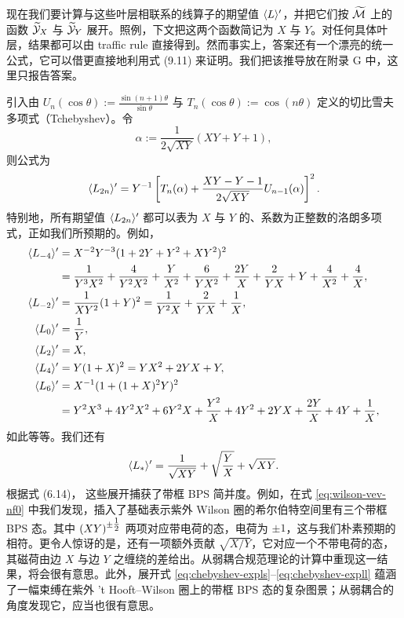现在我们要计算与这些叶层相联系的线算子的期望值 $\langle L \rangle'$，并把它们按 $\widetilde{\cal M}$ 上的函数 $\widetilde{\cal Y}_X$ 与 $\widetilde{\cal Y}_Y$ 展开。照例，下文把这两个函数简记为 $X$ 与 $Y$。对任何具体叶层，结果都可以由 traffic rule 直接得到。然而事实上，答案还有一个漂亮的统一公式，它可以借更直接地利用式 (9.11)%
来证明。我们把该推导放在附录 G%
中，这里只报告答案。

引入由 $U_n(\cos\theta) := \frac{\sin(n+1)\theta}{\sin\theta}$ 与 $T_n(\cos\theta) := \cos(n\theta)$ 定义的切比雪夫多项式（Tchebyshev）。令
\begin{equation}
 \alpha := \frac{1}{2 \sqrt{XY}} \left( XY + Y + 1 \right),
\end{equation}
则公式为
\begin{equation}\label{eq:chebyshev-form}
\langle L_{2n} \rangle' = Y^{-1} \left[T_n(\alpha) + \frac{XY- Y - 1}{2 \sqrt{X Y}} U_{n-1}(\alpha) \right]^2.
\end{equation}
特别地，所有期望值 $\langle L_{2n} \rangle'$ 都可以表为 $X$ 与 $Y$ 的、系数为正整数的洛朗多项式，正如我们所预期的。例如，
\begin{align}
\langle L_{-4} \rangle' & = X^{-2} Y^{-3} (1+ 2 Y + Y^2 + X Y^2)^2 \label{eq:chebyshev-expls} \\
&= \frac{1}{Y^3 X^2}+\frac{4}{Y^2 X^2}+\frac{Y}{X^2}+\frac{6}{Y X^2}+\frac{2 Y}{X}+\frac{2}{Y X}+Y+\frac{4}{X^2}+\frac{4}{X}, \\
\langle L_{-2} \rangle' &= \frac{1}{X Y^2} (1 + Y)^2=\frac{1}{Y^2 X}+\frac{2}{Y X}+\frac{1}{X}, \\
\langle L_{0} \rangle' &= \frac{1}{Y}, \\
\langle L_{2} \rangle' &= X, \\
\langle L_{4} \rangle' &= Y(1+X)^2 = Y X^2+2 Y X+Y, \\
\langle L_{6} \rangle' & = X^{-1} (1+ (1+X)^2 Y)^2 \\
&= Y^2 X^3+4 Y^2 X^2+6 Y^2 X+\frac{Y^2}{X}+4 Y^2+2 Y X+\frac{2 Y}{X}+4 Y+\frac{1}{X}, \label{eq:chebyshev-expll}
\end{align}
如此等等。我们还有
%
\begin{equation} \label{eq:wilson-vev-nf0}
\langle L_* \rangle' = \frac{1}{\sqrt{XY}} + \sqrt{\frac{Y}{X}} + \sqrt{XY}.
\end{equation}
根据式 (6.14)，%
这些展开捕获了带框 BPS 简并度。例如，在式 \eqref{eq:wilson-vev-nf0} 中我们发现，插入了基础表示紫外 Wilson 圈的希尔伯特空间里有三个带框 BPS 态。其中 $(XY)^{\pm \tfrac{1}{2}}$ 两项对应带电荷的态，电荷为 $\pm 1$，这与我们朴素预期的相符。更令人惊讶的是，还有一项额外贡献 $\sqrt{X/Y}$，它对应一个不带电荷的态，其磁荷由边 $X$ 与边 $Y$ 之缠绕的差给出。从弱耦合规范理论的计算中重现这一结果，将会很有意思。此外，展开式 \eqref{eq:chebyshev-expls}--\eqref{eq:chebyshev-expll} 蕴涵了一幅束缚在紫外 't Hooft--Wilson 圈上的带框 BPS 态的复杂图景；从弱耦合的角度发现它，应当也很有意思。

